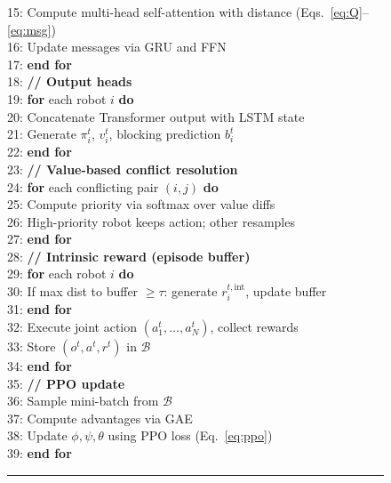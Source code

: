 \documentclass[conference]{IEEEtran}
\begin{document}
\begin{figure}[t]
{15: \quad\quad\quad Compute multi-head self-attention with distance
   (Eqs.~\ref{eq:Q}--\ref{eq:msg})\\
16: \quad\quad\quad Update messages via GRU and FFN\\
17: \quad\quad \textbf{end for}\\
18: \quad\quad \textbf{// Output heads}\\
19: \quad\quad \textbf{for} each robot $i$ \textbf{do}\\
20: \quad\quad\quad Concatenate Transformer output with LSTM state\\
21: \quad\quad\quad Generate $\pi_i^t$, $v_i^t$, blocking prediction $b_i^t$\\
22: \quad\quad \textbf{end for}\\
23: \quad\quad \textbf{// Value-based conflict resolution}\\
24: \quad\quad \textbf{for} each conflicting pair $(i,j)$ \textbf{do}\\
25: \quad\quad\quad Compute priority via softmax over value diffs\\
26: \quad\quad\quad High-priority robot keeps action; other resamples\\
27: \quad\quad \textbf{end for}\\
28: \quad\quad \textbf{// Intrinsic reward (episode buffer)}\\
29: \quad\quad \textbf{for} each robot $i$ \textbf{do}\\
30: \quad\quad\quad If max dist to buffer $\ge \tau$: generate
   $r_i^{t,\mathrm{int}}$, update buffer\\
31: \quad\quad \textbf{end for}\\
32: \quad\quad Execute joint action $(a_1^t,\ldots,a_N^t)$, collect rewards\\
33: \quad\quad Store $(o^t, a^t, r^t)$ in $\mathcal{B}$\\
34: \quad\textbf{end for}\\
35: \quad \textbf{// PPO update}\\
36: \quad Sample mini-batch from $\mathcal{B}$\\
37: \quad Compute advantages via GAE\\
38: \quad Update $\phi, \psi, \theta$ using PPO loss (Eq.~\ref{eq:ppo})\\
39: \textbf{end for}
}\smallskip\hrule
\end{figure}

\end{document}
